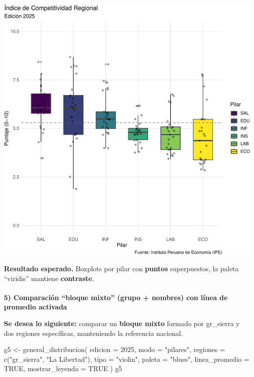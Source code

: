 \documentclass[
  11pt,
  letterpaper,
  DIV=11,
  numbers=noendperiod]{scrartcl}
\makeatletter
\let\oldparagraph\paragraph
\renewcommand{\paragraph}{
    \@ifstar
      \xxxParagraphStar
      \xxxParagraphNoStar
  }
\newcommand{\xxxParagraphStar}[1]{\oldparagraph*{#1}\mbox{}}
\newcommand{\xxxParagraphNoStar}[1]{\oldparagraph{#1}\mbox{}}
\newenvironment{Shaded}{\begin{snugshade}}{\end{snugshade}}
\newcommand{\AttributeTok}[1]{\textcolor[rgb]{0.40,0.45,0.13}{#1}}
\newcommand{\ConstantTok}[1]{\textcolor[rgb]{0.56,0.35,0.01}{#1}}
\newcommand{\DecValTok}[1]{\textcolor[rgb]{0.68,0.00,0.00}{#1}}
\newcommand{\FunctionTok}[1]{\textcolor[rgb]{0.28,0.35,0.67}{#1}}
\newcommand{\NormalTok}[1]{\textcolor[rgb]{0.00,0.23,0.31}{#1}}
\newcommand{\OtherTok}[1]{\textcolor[rgb]{0.00,0.23,0.31}{#1}}
\newcommand{\StringTok}[1]{\textcolor[rgb]{0.13,0.47,0.30}{#1}}
\makeatother
\begin{document}
\includegraphics{Manual_files/figure-pdf/unnamed-chunk-29-1.pdf}

\textbf{Resultado esperado.} Boxplots por pilar con \textbf{puntos}
superpuestos, la paleta ``viridis'' mantiene \textbf{contraste}.

\paragraph{\texorpdfstring{\textbf{5) Comparación ``bloque mixto''
(grupo + nombres) con línea de promedio
activada}}{5) Comparación ``bloque mixto'' (grupo + nombres) con línea de promedio activada}}\label{comparaciuxf3n-bloque-mixto-grupo-nombres-con-luxednea-de-promedio-activada}

\textbf{Se desea lo siguiente:} comparar un \textbf{bloque mixto}
formado por gr\_sierra y dos regiones específicas, manteniendo la
referencia nacional.

\begin{Shaded}
\begin{Highlighting}[]
\NormalTok{g5 }\OtherTok{\textless{}{-}} \FunctionTok{general\_distribucion}\NormalTok{(}
  \AttributeTok{edicion =} \DecValTok{2025}\NormalTok{,}
  \AttributeTok{modo    =} \StringTok{"pilares"}\NormalTok{,}
  \AttributeTok{regiones =} \FunctionTok{c}\NormalTok{(}\StringTok{"gr\_sierra"}\NormalTok{, }\StringTok{"La Libertad"}\NormalTok{),}
  \AttributeTok{tipo    =} \StringTok{"violin"}\NormalTok{,}
  \AttributeTok{paleta  =} \StringTok{"blues"}\NormalTok{,}
  \AttributeTok{linea\_promedio =} \ConstantTok{TRUE}\NormalTok{,}
  \AttributeTok{mostrar\_leyenda =} \ConstantTok{TRUE}
\NormalTok{)}
\NormalTok{g5}
\end{Highlighting}
\end{Shaded}
\end{document}
